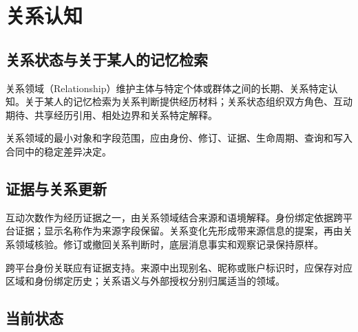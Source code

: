 \chapter{关系认知}

\section{关系状态与关于某人的记忆检索}

关系领域（Relationship）维护主体与特定个体或群体之间的长期、关系特定认知。关于某人的记忆检索为关系判断提供经历材料；关系状态组织双方角色、互动期待、共享经历引用、相处边界和关系特定解释。\cite{nous-research-package,baldwin1992}

关系领域的最小对象和字段范围，应由身份、修订、证据、生命周期、查询和写入合同中的稳定差异决定。

\section{证据与关系更新}

互动次数作为经历证据之一，由关系领域结合来源和语境解释。身份绑定依据跨平台证据；显示名称作为来源字段保留。关系变化先形成带来源信息的提案，再由关系领域核验。修订或撤回关系判断时，底层消息事实和观察记录保持原样。

跨平台身份关联应有证据支持。来源中出现别名、昵称或账户标识时，应保存对应区域和身份绑定历史；关系语义与外部授权分别归属适当的领域。

\section{当前状态}



